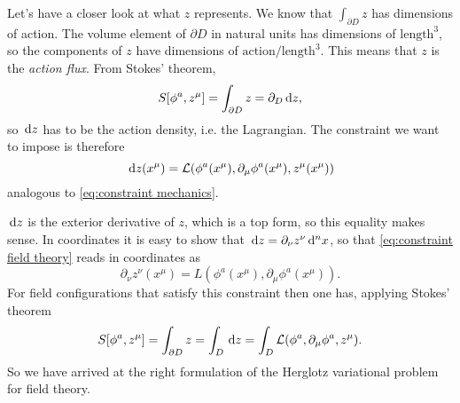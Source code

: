 \documentclass[../main.tex]{subfiles}
\begin{document}
Let's have a closer look at what \( z \) represents. We know that \( \int_{\partial D} z
\) has dimensions of action. The volume element of \( \partial D \) in natural units has
dimensions of \( \text{length}^3 \), so the components of \( z \) have dimensions of \(
\text{action}/\text{length}^3 \). This means that \( z \) is the \emph{action flux}. From
Stokes' theorem,
\begin{equation*}
	S[\phi^a, z^\mu] = \int_{\partial D} z = \partial_D \,\mathrm{d} z,
\end{equation*}
so \( \,\mathrm{d} z \) has to be the action density, i.e. the Lagrangian. The constraint we want
to impose is therefore 
\begin{equation} \label{eq:constraint field theory}
	\,\mathrm{d} z(x^\mu) = \mathcal{L}(\phi^a(x^\mu), \partial_\mu \phi^a(x^\mu), z^\mu(x^\mu))
\end{equation}
analogous to \cref{eq:constraint mechanics}. 

\( \,\mathrm{d} z \) is the exterior derivative of \( z \), which is a top form, so this equality
makes sense. In coordinates it is easy to show that \( \,\mathrm{d} z = \partial_\nu z^\nu \,\mathrm{d}^n x
\), so that \cref{eq:constraint field theory} reads in coordinates as
\begin{equation} \label{eq:constraint field theory coordinates}
	\partial_\nu z^\nu (x^\mu) = L(\phi^a(x^\mu), \partial_\mu \phi^a(x^\mu)).
\end{equation}
For field configurations that satisfy this constraint then one has, applying Stokes'
theorem
\begin{equation*}
	S[\phi^a, z^\mu] = \int_{\partial D} z = \int_D \,\mathrm{d} z = \int_D \mathcal{L}(\phi^a, \partial_\mu
	\phi^a, z^\mu). 
\end{equation*}
So we have arrived at the right formulation of the Herglotz variational problem for field
theory.
\end{document}
